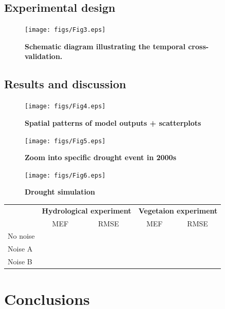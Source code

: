 \subsection{Experimental design}

    \begin{figure}[!ht]
    \centering
    \texttt{[image: figs/Fig3.eps]}
    \caption{\textbf{Schematic diagram illustrating the temporal cross-validation.}}
    \label{fig:14.3}
    \end{figure}

\subsection{Results and discussion}

    \begin{figure}[!ht]
    \centering
    \texttt{[image: figs/Fig4.eps]}
    \caption{\textbf{Spatial patterns of model outputs + scatterplots}}
    \label{fig:14.4}
    \end{figure}

    \begin{figure}[!ht]
    \centering
    \texttt{[image: figs/Fig5.eps]}
    \caption{\textbf{Zoom into specific drought event in 2000s}}
    \label{fig:14.5}
    \end{figure}

    \begin{figure}[!ht]
    \centering
    \texttt{[image: figs/Fig6.eps]}
    \caption{\textbf{Drought simulation}}
    \label{fig:14.6}
    \end{figure}

    \begin{table}[!ht]
    \begin{tabular}{l|ll|ll}
    & \multicolumn{2}{c|}{\textbf{Hydrological experiment}} & \multicolumn{2}{c}{\textbf{Vegetaion experiment}} \\
    & \multicolumn{1}{c}{MEF} & \multicolumn{1}{c|}{RMSE} & \multicolumn{1}{c}{MEF} & \multicolumn{1}{c}{RMSE} \\ \hline
    No noise &  &  &  &  \\
    Noise A &  &  &  &  \\
    Noise B &  &  &  & 
    \end{tabular}
    \end{table}

\section{Conclusions}

\backmatter

%

